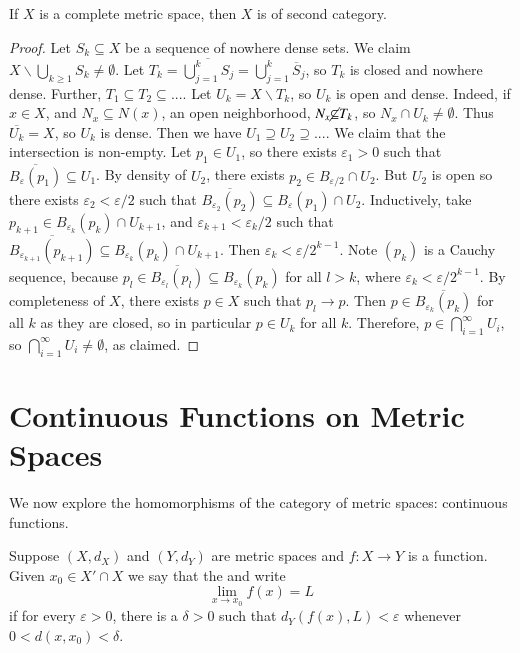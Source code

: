 \begin{namthm}
    If $X$ is a complete metric space, then $X$ is of second category.
\end{namthm}
\begin{proof}
    Let $S_k \subseteq X$ be a sequence of nowhere dense sets. We claim $X \backslash \bigcup_{k\geq 1}S_k \neq \emptyset$. Let $T_k = \overline{\bigcup_{j=1}^kS_j} = \bigcup_{j=1}^k\overline{S}_j$, so $T_k$ is closed and nowhere dense. Further, $T_1 \subseteq T_2 \subseteq ...$. Let $U_k = X\backslash T_k$, so $U_k$ is open and dense. Indeed, if $x \in X$, and $N_x \subseteq N(x)$, an open neighborhood, $N_x \cancel{\subseteq}T_k$, so $N_x\cap U_k \neq \emptyset$. Thus $\overline{U_k} = X$, so $U_k$ is dense. Then we have $U_1 \supseteq U_2 \supseteq ...$. We claim that the intersection is non-empty. Let $p_1 \in U_1$, so there exists $\varepsilon_1 > 0$ such that $\overline{B_{\varepsilon}(p_1)} \subseteq U_1$. By density of $U_2$, there exists $p_2 \in B_{\varepsilon/2}\cap U_2$. But $U_2$ is open so there exists $\varepsilon_2 < \varepsilon/2$ such that $\overline{B_{\varepsilon_2}(p_2)} \subseteq B_{\varepsilon}(p_1)\cap U_2$. Inductively, take $p_{k+1} \in B_{\varepsilon_k}(p_k) \cap U_{k+1}$, and $\varepsilon_{k+1} < \varepsilon_k/2$ such that $\overline{B_{\varepsilon_{k+1}}(p_{k+1})} \subseteq B_{\varepsilon_k}(p_k) \cap U_{k+1}$. Then $\varepsilon_k < \varepsilon/2^{k-1}$. Note $(p_k)$ is a Cauchy sequence, because $p_l \in \overline{B_{\varepsilon_l}(p_l)} \subseteq B_{\varepsilon_k}(p_k)$ for all $l > k$, where $\varepsilon_k < \varepsilon/2^{k-1}$. By completeness of $X$, there exists $p \in X$ such that $p_l \rightarrow p$. Then $p \in \overline{B_{\varepsilon_k}(p_k)}$ for all $k$ as they are closed, so in particular $p \in U_k$ for all $k$. Therefore, $p \in \bigcap_{i=1}^{\infty}U_i$, so $\bigcap_{i=1}^{\infty}U_i\neq \emptyset$, as claimed.
\end{proof}

\section{Continuous Functions on Metric Spaces}

We now explore the homomorphisms of the category of metric spaces: continuous functions.

\begin{defn}
    Suppose $(X,d_X)$ and $(Y,d_Y)$ are metric spaces and $f:X\rightarrow Y$ is a function. Given $x_0 \in X'\cap X$ we say that the  and write $$\lim\limits_{x\rightarrow x_0}f(x) = L$$ if for every $\varepsilon > 0$, there is a $\delta > 0$ such that $d_Y(f(x),L) < \varepsilon$ whenever $0 < d(x,x_0) < \delta$.
\end{defn}



